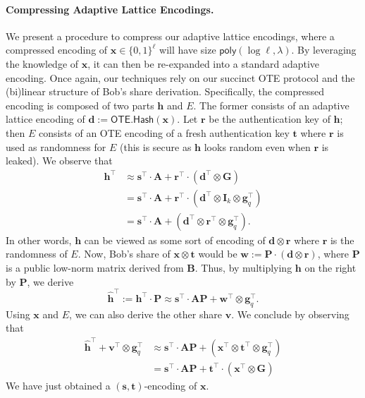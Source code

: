 \documentclass{article}
\newcommand{\OTE}{\mathsf{OTE}}
\newcommand{\poly}{\mathsf{poly}}
\renewcommand{\sec}{\ensuremath{\lambda}}
\newcommand{\algofont}[1]{\ensuremath{\mathsf{#1}}}
\newcommand{\Hash}{{\algofont{Hash}}}
\newcommand{\id}{\ensuremath{\mathbf{I}}}
\begin{document}
\paragraph{Compressing Adaptive Lattice Encodings.} We present a procedure to compress our adaptive lattice encodings, where a compressed encoding of $\mathbf{x}\in\{0, 1\}^\ell$ will have size $\poly(\log \ell, \sec)$. By leveraging the knowledge of $\mathbf{x}$, it can then be re-expanded into a standard adaptive encoding. Once again, our techniques rely on our succinct OTE protocol and the (bi)linear structure of Bob's share derivation. Specifically, the compressed encoding is composed of two parts $\mathbf{h}$ and $E$. The former consists of an adaptive lattice encoding of $\mathbf{d}:=\OTE.\Hash(\mathbf{x})$. Let $\mathbf{r}$ be the authentication key of $\mathbf{h}$; then $E$ consists of an OTE encoding of a fresh authentication key $\mathbf{t}$ where $\mathbf{r}$ is used as randomness for $E$ (this is secure as $\mathbf{h}$ looks random even when $\mathbf{r}$ is leaked). We observe that
\begin{align*}
    \mathbf{h}^\intercal&\approx\mathbf{s}^\intercal \cdot \mathbf{A}+\mathbf{r}^\intercal \cdot (\mathbf{d}^\intercal\otimes \mathbf{G})\\
    &=\mathbf{s}^\intercal \cdot \mathbf{A}+\mathbf{r}^\intercal \cdot (\mathbf{d}^\intercal\otimes \id_k\otimes \mathbf{g}_q^\intercal)\\
    &=\mathbf{s}^\intercal \cdot \mathbf{A}+(\mathbf{d}^\intercal\otimes \mathbf{r}^\intercal \otimes \mathbf{g}_q^\intercal).
\end{align*}
In other words, $\mathbf{h}$ can be viewed as some sort of encoding of $\mathbf{d}\otimes \mathbf{r}$ where $\mathbf{r}$ is the randomness of $E$. Now, Bob's share of $\mathbf{x}\otimes \mathbf{t}$ would be $\mathbf{w}:=\mathbf{P}\cdot (\mathbf{d}\otimes \mathbf{r})$, where $\mathbf{P}$ is a public low-norm matrix derived from $\mathbf{B}$. Thus, by multiplying $\mathbf{h}$ on the right by $\mathbf{P}$, we derive
\[\hat{\mathbf{h}}^\intercal:=\mathbf{h}^\intercal\cdot \mathbf{P}\approx \mathbf{s}^\intercal \cdot \mathbf{A} \mathbf{P}+\mathbf{w}^\intercal\otimes \mathbf{g}_q^\intercal.\]
 Using $\mathbf{x}$ and $E$, we can also derive the other share $\mathbf{v}$. We conclude by observing that
\begin{align*}
    \hat{\mathbf{h}}^\intercal+\mathbf{v}^\intercal\otimes \mathbf{g}_q^\intercal&\approx \mathbf{s}^\intercal \cdot \mathbf{A} \mathbf{P}+ (\mathbf{x}^\intercal\otimes \mathbf{t}^\intercal \otimes \mathbf{g}_q^\intercal)\\
    &=\mathbf{s}^\intercal \cdot \mathbf{A} \mathbf{P}+ \mathbf{t}^\intercal\cdot (\mathbf{x}^\intercal\otimes \mathbf{G})
\end{align*}
We have just obtained a $(\mathbf{s}, \mathbf{t})$-encoding of $\mathbf{x}$.
\end{document}
